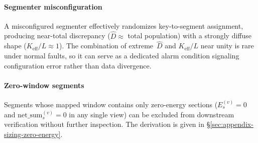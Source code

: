 \paragraph{Segmenter misconfiguration}
A misconfigured segmenter effectively randomizes key-to-segment
assignment, producing near-total discrepancy
($\hat{D} \approx$ total population) with a strongly diffuse
shape ($K_{\text{eff}}/L \approx 1$).  The combination of
extreme~$\hat{D}$ and $K_{\text{eff}}/L$ near unity is rare
under normal faults, so it can serve as a dedicated alarm
condition signaling configuration error rather than data
divergence.

\paragraph{Zero-window segments}
Segments whose mapped window contains only zero-energy sections
($E_s^{(v)}{=}0$ and $\mathrm{net\_sum}_s^{(v)}{=}0$ in any
single view) can be excluded from downstream verification
without further inspection.  The derivation is given in
\S\ref{sec:appendix-sizing-zero-energy}.
